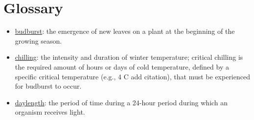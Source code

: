 \documentclass{article}
\begin{document}
\section* {Glossary}
\begin{itemize}
\item \underline{budburst}: the emergence of new leaves on a plant at the beginning of the growing season. %
\item \underline{chilling}: the intensity and duration of winter temperature; critical chilling is the required amount of hours or days of cold temperature, defined by a specific critical temperature (e.g., 4 \degree C add citation), that must be experienced for budburst to occur.
\item \underline{daylength}: the period of time during a 24-hour period during which an organism receives light.


\end{itemize}
\end{document}
